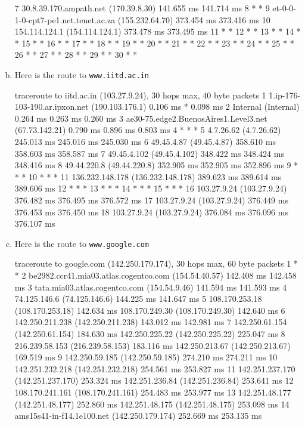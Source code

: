 \begin{enumerate}[a.]
\begin{code}
 7  30.8.39.170.ampath.net (170.39.8.30)  141.655 ms  141.714 ms
 8  * *
 9  et-0-0-1-0-cpt7-pe1.net.tenet.ac.za (155.232.64.70)  373.454 ms  373.416 ms
10  154.114.124.1 (154.114.124.1)  373.478 ms  373.495 ms
11  * *
12  * *
13  * *
14  * *
15  * *
16  * *
17  * *
18  * *
19  * *
20  * *
21  * *
22  * *
23  * *
24  * *
25  * *
26  * *
27  * *
28  * *
29  * *
30  * *
\end{code}
\item Here is the route to {\tt www.iitd.ac.in}
\begin{code} 
traceroute to iitd.ac.in (103.27.9.24), 30 hops max, 40 byte packets
 1  1.ip-176-103-190.ar.ipxon.net (190.103.176.1)  0.106 ms *  0.098 ms
 2  Internal (Internal)  0.264 ms  0.263 ms  0.260 ms
 3  ae30-75.edge2.BuenosAires1.Level3.net (67.73.142.21)  0.790 ms  0.896 ms  0.803 ms
 4  * * *
 5  4.7.26.62 (4.7.26.62)  245.013 ms  245.016 ms  245.030 ms
 6  49.45.4.87 (49.45.4.87)  358.610 ms  358.603 ms  358.587 ms
 7  49.45.4.102 (49.45.4.102)  348.422 ms  348.424 ms  348.416 ms
 8  49.44.220.8 (49.44.220.8)  352.905 ms  352.905 ms  352.896 ms
 9  * * *
10  * * *
11  136.232.148.178 (136.232.148.178)  389.623 ms  389.614 ms  389.606 ms
12  * * *
13  * * *
14  * * *
15  * * *
16  103.27.9.24 (103.27.9.24)  376.482 ms  376.495 ms  376.572 ms
17  103.27.9.24 (103.27.9.24)  376.449 ms  376.453 ms  376.450 ms
18  103.27.9.24 (103.27.9.24)  376.084 ms  376.096 ms  376.107 ms
\end{code}
\item Here is the route to {\tt www.google.com}
\begin{code}
 traceroute to google.com (142.250.179.174), 30 hops max, 60 byte packets
 1  * *
 2  be2982.ccr41.mia03.atlas.cogentco.com (154.54.40.57)  142.408 ms  142.458 ms
 3  tata.mia03.atlas.cogentco.com (154.54.9.46)  141.594 ms  141.593 ms
 4  74.125.146.6 (74.125.146.6)  144.225 ms  141.647 ms
 5  108.170.253.18 (108.170.253.18)  142.634 ms 108.170.249.30 (108.170.249.30)  142.640 ms
 6  142.250.211.238 (142.250.211.238)  143.012 ms  142.981 ms
 7  142.250.61.154 (142.250.61.154)  184.630 ms 142.250.225.22 (142.250.225.22)  225.047 ms
 8  216.239.58.153 (216.239.58.153)  183.116 ms 142.250.213.67 (142.250.213.67)  169.519 ms
 9  142.250.59.185 (142.250.59.185)  274.210 ms  274.211 ms
10  142.251.232.218 (142.251.232.218)  254.561 ms  253.827 ms
11  142.251.237.170 (142.251.237.170)  253.324 ms 142.251.236.84 (142.251.236.84)  253.641 ms
12  108.170.241.161 (108.170.241.161)  254.483 ms  253.977 ms
13  142.251.48.177 (142.251.48.177)  252.860 ms 142.251.48.175 (142.251.48.175)  253.098 ms
14  ams15s41-in-f14.1e100.net (142.250.179.174)  252.669 ms  253.135 ms
\end{code}


\end{enumerate}
